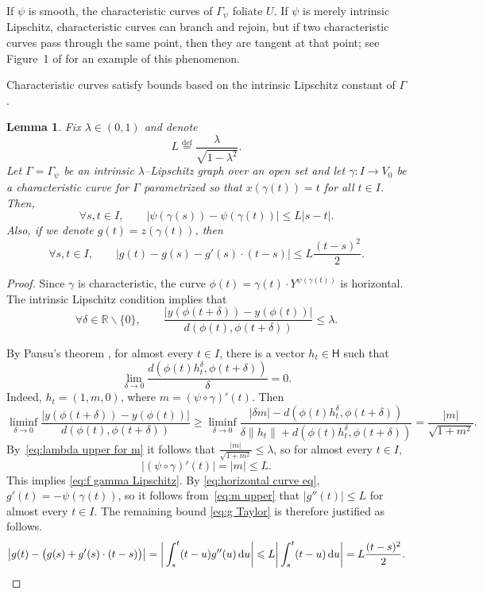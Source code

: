 \documentclass[11pt,reqno]{amsart}
\newcommand{\R}{\mathbb{R}}
\newcommand{\ud}[0]{\,\mathrm{d}}
\newcommand{\0}{\mathbf{0}}
\renewcommand{\1}{\mathbf 1}
\newcommand{\from}{\colon}
\newcommand{\eqdef}{\stackrel{\mathrm{def}}{=}}
\renewcommand{\ge}{\geqslant}
\renewcommand{\le}{\leqslant}
\renewcommand{\setminus}{\smallsetminus}
\newtheorem{lemma}[thm]{Lemma}
\theoremstyle{remark}
\begin{document}
If $\psi$ is smooth, the characteristic curves of $\Gamma_\psi$ foliate $U$. If $\psi$ is merely intrinsic Lipschitz, characteristic curves can branch and rejoin, but if two characteristic curves pass through the same point, then they are tangent at that point; see Figure~1 of \cite{BigolinCaravennaSerraCassano} for an example of this phenomenon.


Characteristic curves satisfy bounds based on the intrinsic Lipschitz constant of $\Gamma$.
\begin{lemma}\label{lem:char curve z bounds} Fix $\lambda\in (0,1)$ and denote
$$
L\eqdef \frac{\lambda}{\sqrt{1-\lambda^2}}.
$$
  Let $\Gamma=\Gamma_\psi$ be an intrinsic $\lambda$--Lipschitz graph over an open set and let $\gamma\from I\to V_0$ be a characteristic curve for $\Gamma$ parametrized so that $x(\gamma(t))=t$ for all $t\in I$.   Then,
  \begin{equation}\label{eq:f gamma Lipschitz}
 \forall  s,t\in I,\qquad    |\psi(\gamma(s))-\psi(\gamma(t))|\le L|s-t| .
  \end{equation}
Also, if we denote $g(t)=z(\gamma(t))$, then
  \begin{equation}\label{eq:g Taylor}
  \forall  s,t\in I,\qquad     \big|g(t) - g(s) - g'(s) \cdot (t-s)\big|\le L\frac{(t-s)^2}{2}.
  \end{equation}
\end{lemma}
\begin{proof}
  Since $\gamma$ is characteristic, the curve
  $\phi(t)=\gamma(t)\cdot Y^{\psi(\gamma(t))}$
  is horizontal.  The intrinsic Lipschitz condition implies that
  \begin{equation}\label{eq:lambda upper for m}\forall  \delta\in \R\setminus \{0\},\qquad \frac{|y(\phi(t+\delta))-y(\phi(t))|}{d(\phi(t), \phi(t+\delta))} \le \lambda.\end{equation}


  By Pansu's theorem \cite{Pan89}, for almost every $t\in I$, there is a vector $h_t\in \mathsf{H}$ such that
  $$\lim_{\delta\to 0} \frac{d\left(\phi(t) h_t^{\delta},\phi(t+\delta)\right)}{\delta} = 0.$$
  Indeed, $h_t=(1, m,0)$, where $m=(\psi\circ \gamma)'(t)$.  Then
  $$\liminf_{\delta\to 0} \frac{|y(\phi(t+\delta))-y(\phi(t))|}{d(\phi(t), \phi(t+\delta))} \ge \liminf_{\delta\to 0} \frac{|\delta m| - d(\phi(t) h_t^{\delta},\phi(t+\delta))}{\delta\|h_t\|+d(\phi(t) h_t^{\delta},\phi(t+\delta))} = \frac{|m|}{\sqrt{1+m^2}}.$$
  By~\eqref{eq:lambda upper for m} it follows that $\frac{|m|}{\sqrt{1+m^2}} \le \lambda$, so for almost every $t\in I$,
  \begin{equation}\label{eq:m upper}|(\psi\circ \gamma)'(t)|=|m| \le L.\end{equation}
  This implies \eqref{eq:f gamma Lipschitz}. By \eqref{eq:horizontal curve eq}, $g'(t)=-\psi(\gamma(t))$, so it follows from~\eqref{eq:m upper} that $|g''(t)|\le L$  for almost every $t\in I$. The remaining bound \eqref{eq:g Taylor} is therefore justified as follows.
  \begin{equation*}
  \left|g(t) - \big(g(s) + g'(s) \cdot (t-s)\big)\right|=\bigg|\int_s^t  (t-u)g''(u)\ud u\bigg|\le L\bigg|\int_s^t  (t-u)\ud u\bigg|=L\frac{(t-s)^2}{2}.\qedhere
  \end{equation*}
\end{proof}
\end{document}
